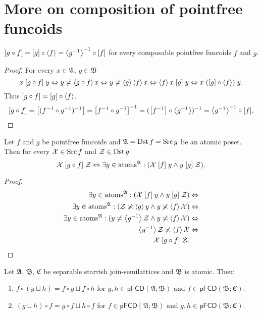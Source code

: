 \section{More on composition of pointfree funcoids}
\begin{prop}
$\mathord{\mathrel{\left[g\circ f\right]}}=\mathord{\mathrel{\left[g\right]}}\circ\left\langle f\right\rangle=\left\langle g^{-1}\right\rangle^{-1}\circ\mathord{\mathrel{\left[f\right]}}$
for every composable pointfree funcoids $f$ and $g$.\end{prop}
\begin{proof}
For every $x\in\mathfrak{A}$, $y\in\mathfrak{B}$
\[
x\mathrel{\left[g\circ f\right]}y\Leftrightarrow y\not\asymp\left\langle g\circ f\right\rangle x\Leftrightarrow y\not\asymp\left\langle g\right\rangle\left\langle f\right\rangle x\Leftrightarrow\left\langle f\right\rangle x\mathrel{\left[g\right]}y\Leftrightarrow x\mathrel{(\mathord{\mathrel{\left[g\right]}}\circ\left\langle f\right\rangle)}y.
\]
Thus $\mathord{\mathrel{\left[g\circ f\right]}}=\mathord{\mathrel{\left[g\right]}}\circ\left\langle f\right\rangle$.
\[
\mathord{\mathrel{\left[g\circ f\right]}}=\mathord{\mathrel{\left[(f^{-1}\circ g^{-1})^{-1}\right]}}=\mathord{\mathrel{\left[f^{-1}\circ g^{-1}\right]}}^{-1}=(\mathord{\mathrel{\left[f^{-1}\right]}}\circ\left\langle g^{-1}\right\rangle)^{-1}=\left\langle g^{-1}\right\rangle^{-1}\circ\mathord{\mathrel{\left[f\right]}}.
\]
\end{proof}
\begin{thm}
\label{pf-fcd-atom-middle}Let $f$ and $g$ be pointfree funcoids
and $\mathfrak{A}=\operatorname{Dst} f=\operatorname{Src} g$ be an atomic poset. Then for every
$\mathcal{X}\in\operatorname{Src} f$ and $\mathcal{Z}\in\operatorname{Dst} g$
\[
\mathcal{X}\mathrel{\left[g\circ f\right]}\mathcal{Z}\Leftrightarrow\exists y\in\operatorname{atoms}^{\mathfrak{A}}:(\mathcal{X}\mathrel{\left[f\right]}y\land y\mathrel{\left[g\right]}\mathcal{Z}).
\]
\end{thm}
\begin{proof}
~
\begin{align*}
\exists y\in\operatorname{atoms}^{\mathfrak{A}}:(\mathcal{X}\mathrel{\left[f\right]}y\land y\mathrel{\left[g\right]}\mathcal{Z}) & \Leftrightarrow\\
\exists y\in\operatorname{atoms}^{\mathfrak{A}}:(\mathcal{Z}\not\asymp\left\langle g\right\rangle y\land y\not\asymp\left\langle f\right\rangle\mathcal{X}) & \Leftrightarrow\\
\exists y\in\operatorname{atoms}^{\mathfrak{A}}:(y\not\asymp\left\langle g^{-1}\right\rangle\mathcal{Z}\land y\not\asymp\left\langle f\right\rangle\mathcal{X}) & \Leftrightarrow\\
\left\langle g^{-1}\right\rangle\mathcal{Z}\not\asymp\left\langle f\right\rangle\mathcal{X} & \Leftrightarrow\\
\mathcal{X}\mathrel{\left[g\circ f\right]}\mathcal{Z}.
\end{align*}
\end{proof}
\begin{thm}
Let $\mathfrak{A}$, $\mathfrak{B}$, $\mathfrak{C}$ be separable
starrish join-semilattices and $\mathfrak{B}$ is atomic. Then:
\begin{enumerate}
\item $f\circ(g\sqcup h)=f\circ g\sqcup f\circ h$ for $g,h\in\mathsf{pFCD}(\mathfrak{A};\mathfrak{B})$
and $f\in\mathsf{pFCD}(\mathfrak{B};\mathfrak{C})$.
\item $(g\sqcup h)\circ f=g\circ f\sqcup h\circ f$ for $f\in\mathsf{pFCD}(\mathfrak{A};\mathfrak{B})$
and $g,h\in\mathsf{pFCD}(\mathfrak{B};\mathfrak{C})$.
\end{enumerate}
\end{thm}
